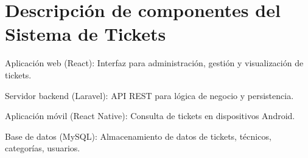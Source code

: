 \appendix
\section{Descripción de componentes del Sistema de Tickets}
Aplicación web (React): Interfaz para administración, gestión y visualización de tickets.

Servidor backend (Laravel): API REST para lógica de negocio y persistencia.

Aplicación móvil (React Native): Consulta de tickets en dispositivos Android.

Base de datos (MySQL): Almacenamiento de datos de tickets, técnicos, categorías, usuarios.